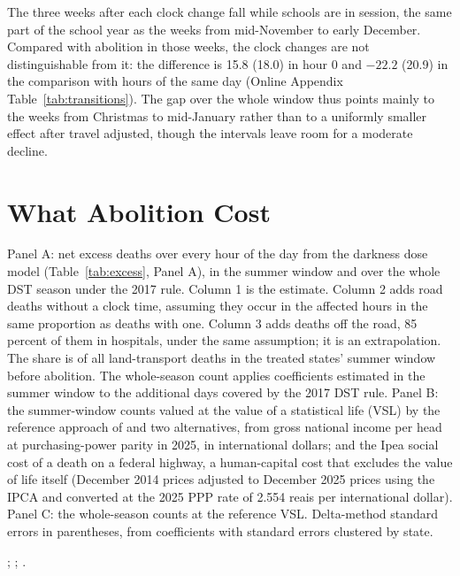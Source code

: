 The three weeks after each clock change fall while schools are in session, the same part of the school year as the weeks from mid-November to early December. Compared with abolition in those weeks, the clock changes are not distinguishable from it: the difference is 15.8 (18.0) in hour 0 and $-22.2$ (20.9) in the comparison with hours of the same day (Online Appendix Table~\ref{tab:transitions}). The gap over the whole window thus points mainly to the weeks from Christmas to mid-January rather than to a uniformly smaller effect after travel adjusted, though the intervals leave room for a moderate decline.

\section{What Abolition Cost}\label{sec:cost}

\begin{table}[tbp]
  \caption{Deaths per Summer and What They Are Worth}
  \label{tab:cost}
  \centering\footnotesize
  
  \begin{tablenotes}[Notes]
  Panel A: net excess deaths over every hour of the day from the darkness dose model (Table~\ref{tab:excess}, Panel A), in the summer window and over the whole DST season under the 2017 rule. Column 1 is the estimate. Column 2 adds road deaths without a clock time, assuming they occur in the affected hours in the same proportion as deaths with one. Column 3 adds deaths off the road, 85 percent of them in hospitals, under the same assumption; it is an extrapolation. The share is of all land-transport deaths in the treated states' summer window before abolition. The whole-season count applies coefficients estimated in the summer window to the additional days covered by the 2017 DST rule. Panel B: the summer-window counts valued at the value of a statistical life (VSL) by the reference approach of \citet{robinson2019valuing} and two alternatives, from gross national income per head at purchasing-power parity in 2025, in international dollars; and the Ipea social cost of a death on a federal highway, a human-capital cost that excludes the value of life itself (December 2014 prices adjusted to December 2025 prices using the IPCA and converted at the 2025 PPP rate of 2.554 reais per international dollar). Panel C: the whole-season counts at the reference VSL. Delta-method standard errors in parentheses, from coefficients with standard errors clustered by state.
  \end{tablenotes}
  \begin{tablenotes}[Sources]
  \citet{worldbank2026wdi}; \citet{ipea2015acidentes}; \citet{ibge2026ipca}.
  \end{tablenotes}
\end{table}

